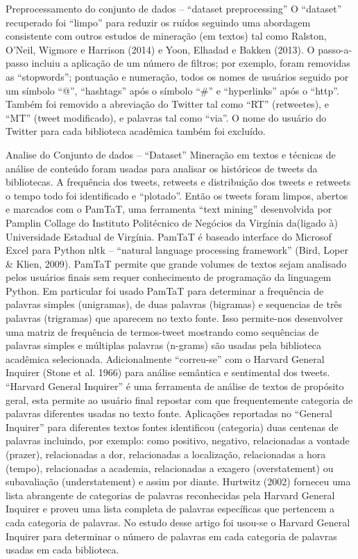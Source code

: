 Preprocessamento do conjunto de dados – ``dataset preprocessing''
O ``dataset'' recuperado foi ``limpo'' para reduzir os ruídos seguindo uma abordagem consistente com outros estudos de mineração (em textos) tal como Ralston, O’Neil, Wigmore e Harrison (2014) e Yoon, Elhadad e Bakken (2013). O passo-a-passo incluiu a aplicação de um número de filtros; por exemplo, foram removidas as ``stopwords''; pontuação e numeração, 
todos os nomes de usuários seguido por um símbolo ``@'', ``hashtags'' após o símbolo ``\#'' e ``hyperlinks'' após o ``http''. 
Também foi removido a abreviação do Twitter tal como ``RT'' (retweetes), e ``MT'' (tweet modificado), e palavras tal como ``via''. 
O nome do usuário do Twitter para cada biblioteca acadêmica também foi excluído.


Analise do Conjunto de dados – ``Dataset''
Mineração em textos e técnicas de análise de conteúdo foram usadas para analisar os históricos de tweets da bibliotecas. A frequência dos tweets, retweets e distribuição dos tweets e retweets o tempo todo foi identificado e “plotado”. Então os tweets foram limpos, abertos e marcados com o PamTaT, uma ferramenta “text mining” desenvolvida por Pamplin Collage do Instituto Politécnico de Negócios da Virgínia da(ligado à) Universidade Estadual de Virgínia.
PamTaT é baseado interface do Microsof Excel para Python nltk – “natural language processing framework” (Bird, Loper \& Klien, 2009).
PamTaT permite que grande volumes de textos sejam analisado pelos usuários finais sem requer conhecimento de programação da linguagem Python. Em particular foi usado PamTaT para determinar a frequência de palavras simples (unigramas), de duas palavras (bigramas) e sequencias de três palavras (trigramas) que aparecem no texto fonte. 
Isso permite-nos desenvolver uma matriz de frequência de termos-tweet mostrando como sequências de palavras simples e múltiplas palavras (n-grams) são usadas pela biblioteca acadêmica selecionada.
Adicionalmente “correu-se” com o Harvard General Inquirer (Stone et al. 1966) para análise semântica e sentimental dos tweets.  “Harvard General Inquirer” é uma ferramenta de análise de textos de propósito geral, esta permite ao usuário final repostar com que frequentemente categoria de palavras diferentes usadas no texto fonte. 
Aplicações reportadas no “General Inquirer” para diferentes textos fontes identificou (categoria) duas centenas de palavras incluindo, por exemplo: como positivo, negativo, relacionadas a vontade (prazer), relacionadas a dor, relacionadas a localização, relacionadas a hora (tempo), relacionadas a academia, relacionadas a exagero (overstatement) ou subavaliação (understatement) e assim por diante.
Hurtwitz (2002) forneceu uma lista abrangente de categorias de palavras reconhecidas pela  Harvard General Inquirer e proveu uma lista completa de palavras específicas que pertencem a cada categoria de palavras. No estudo desse artigo foi usou-se o  Harvard General Inquirer para determinar o número de palavras em cada categoria de palavras usadas em cada biblioteca.

